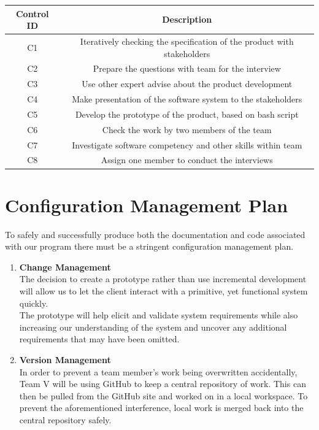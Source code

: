 \documentclass{l3deliverable}
\begin{document}
{\begin{center}{
\begin{tabular}{|c|c|}
\hline \textbf{Control ID} & \textbf{Description}\\
\hline C1 &  Iteratively checking the specification of the product with stakeholders\\
\hline C2 & Prepare the questions with team for the interview\\
\hline C3 & Use other expert advise about the product development\\
\hline C4 & Make presentation of the software system to the stakeholders\\
\hline C5 & Develop the prototype of the product, based on bash script\\
\hline C6 & Check the work by two members of the team\\
\hline C7 & Investigate software competency and other skills within team\\
\hline C8 & Assign one member to conduct the interviews\\
\hline
\end{tabular} }
\end{center}


\section{Configuration Management Plan}

To safely and successfully produce both the documentation and code
associated with our program there must be a stringent configuration
management plan.\\

\begin {enumerate}
\item \textbf{Change Management}\\
The decision to create a prototype rather than use incremental
development will allow us to let the client interact with a primitive,
yet functional system quickly.\\
The prototype will help elicit and validate system requirements while
also increasing our understanding of the system and uncover any
additional requirements that may have been omitted.\\

\item \textbf{Version Management}\\
In order to prevent a team member's work being overwritten
accidentally, Team V will be using GitHub to keep a central repository
of work. This can then be pulled from the GitHub site and worked on in
a local workspace. To prevent the aforementioned interference, local work is
merged back into the central repository safely.\\  


\end{enumerate}}
\end{document}
